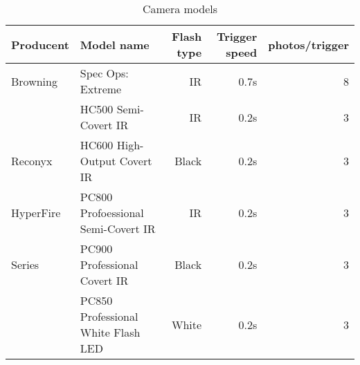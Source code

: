 \begin{table}
\caption{\label{tab:cam_mod} Camera models}
\centering

\begin{tabular}{llrrr}
\hline
Producent  & Model name & Flash type & Trigger speed & photos/trigger  \\
\hline %
Browning	& Spec Ops: Extreme 					& IR	& 0.7s & 8 \\
			& HC500 Semi-Covert IR					& IR	& 0.2s & 3 \\
Reconyx		& HC600 High-Output Covert IR			& Black	& 0.2s & 3 \\
HyperFire 	& PC800 Profoessional Semi-Covert IR 	& IR	& 0.2s & 3 \\
Series 		& PC900 Professional Covert IR 			& Black	& 0.2s & 3 \\
    		& PC850 Professional White Flash LED	& White	& 0.2s & 3 \\
\hline
\end{tabular}

\end{table}
